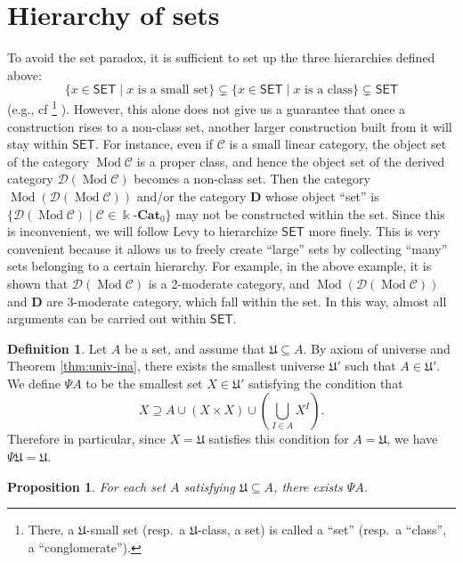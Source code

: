 \documentclass{surv-l}
\numberwithin{equation}{chapter}
\numberwithin{figure}{chapter}
\theoremstyle{plain}
\newtheorem{prp}[thm]{Proposition}
\theoremstyle{definition}
\newtheorem{dfn}[thm]{Definition}
\theoremstyle{remark}
\newcommand{\kCat}{\Bbbk\text{-}\mathbf{Cat}}
\DeclareMathOperator{\Mod}{Mod}
\begin{document}
\section{Hierarchy of sets}To avoid the set paradox, it is sufficient to set up the three hierarchies defined above:
\[
\{x \in \mathsf{SET} \mid \text{$x$ is a small set}\} \subsetneq \{x \in \mathsf{SET} \mid  \text{$x$ is a class}\}
\subsetneq \mathsf{SET}
\]
(e.g., cf \cite{Mur}\footnote{There, a $\mathfrak{U}$-small set (resp.\ a $\mathfrak{U}$-class, a set)
is called a ``set'' (resp.\ a ``class'', a ``conglomerate'').}
).
However, this alone does not give us a guarantee that once a construction rises to a non-class set,
another larger construction built from it will stay within $\mathsf{SET}$.
For instance, even if ${\mathcal{C}}$ is a small linear category,
the object set of the category $\Mod {\mathcal{C}}$ is a proper class, and hence
the object set of the derived category ${\mathcal{D}}(\Mod{\mathcal{C}})$ becomes a non-class set.
Then the category $\Mod({\mathcal{D}}(\Mod{\mathcal{C}}))$ and/or the category $\mathbf{D}$ whose
object ``set'' is $\{{\mathcal{D}}(\Mod{\mathcal{C}}) \mid {\mathcal{C}} \in \kCat_0\}$ may not be constructed within the set.
Since this is inconvenient, we will follow Levy \cite{Le18} to hierarchize $\mathsf{SET}$ more finely.
This is very convenient because it allows us to freely create ``large'' sets
by collecting ``many'' sets belonging to a certain hierarchy.
For example, in the above example, it is shown that ${\mathcal{D}}(\Mod{\mathcal{C}})$ is a 2-moderate category, and $\Mod({\mathcal{D}}(\Mod{\mathcal{C}}))$ and $\mathbf{D}$ are 3-moderate category,
which fall within the set.
In this way, almost all arguments can be carried out within $\mathsf{SET}$.

\begin{dfn}\label{dfn:Psi}
Let $A$ be a set, and assume that $\mathfrak{U} \subseteq A$.
By axiom of universe and Theorem \ref{thm:univ-ina},
there exists the smallest universe $\mathfrak{U}'$ such that
$A \in \mathfrak{U}'$.
We define $\Psi A$ to be the smallest set $X \in \mathfrak{U}'$ satisfying the condition that
\[
X \supseteq A \cup (X \times X) \cup (\bigcup_{I \in A}X^I).
\]
Therefore in particular, since $X = \mathfrak{U}$ satisfies this condition for $A = \mathfrak{U}$,
we have $\Psi \mathfrak{U} = \mathfrak{U}$.
\end{dfn}

\begin{prp}
For each set $A$ satisfying $\mathfrak{U} \subseteq A$,
there exists $\Psi A$.
\end{prp}
\end{document}
